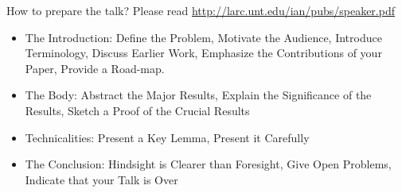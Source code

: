 \documentclass[11pt]{beamer}              %
\begin{document}
\begin{frame}{How to prepare the talk?}
Please read \url{http://larc.unt.edu/ian/pubs/speaker.pdf}
\begin{itemize}
\item The Introduction:  Define the Problem,    Motivate the Audience,    Introduce Terminology,    Discuss Earlier Work,    Emphasize the Contributions of your Paper,    Provide a Road-map.
\item The Body:    Abstract the Major Results, Explain the Significance of the Results, Sketch a Proof of the Crucial Results
\item Technicalities: Present a Key Lemma, Present it Carefully
\item The Conclusion: Hindsight is Clearer than Foresight, Give Open Problems, Indicate that your Talk is Over
\end{itemize}

\end{frame}



\thankslide
\end{document}
